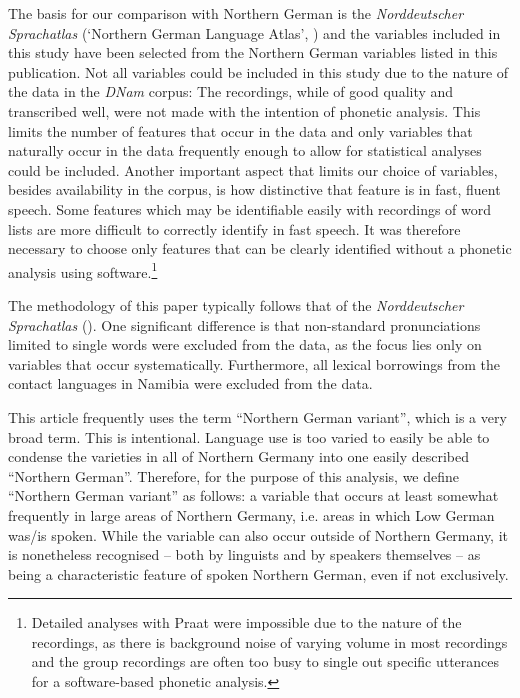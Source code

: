 \documentclass[output=paper]{langsci/langscibook}
\begin{document}
The basis for our comparison with Northern German is the \textit{Norddeutscher Sprachatlas} (‘Northern German Language Atlas’, \citealt{elmentaler_norddeutscher_2015}) and the variables included in this study have been selected from the Northern German variables listed in this publication. Not all variables could be included in this study due to the nature of the data in the \textit{DNam} corpus: The recordings, while of good quality and transcribed well, were not made with the intention of phonetic analysis. This limits the number of features that occur in the data and only variables that naturally occur in the data frequently enough to allow for statistical analyses could be included. Another important aspect that limits our choice of variables, besides availability in the corpus, is how distinctive that feature is in fast, fluent speech. Some features which may be identifiable easily with recordings of word lists are more difficult to correctly identify in fast speech. It was therefore necessary to choose only features that can be clearly identified without a phonetic analysis using software.\footnote{Detailed analyses with Praat were impossible due to the nature of the recordings, as there is background noise of varying volume in most recordings and the group recordings are often too busy to single out specific utterances for a software-based phonetic analysis.}

The methodology of this paper typically follows that of the \textit{Norddeutscher Sprachatlas} (\citealt{elmentaler_norddeutscher_2015}). One significant difference is that non-standard pronunciations limited to single words were excluded from the data, as the focus lies only on variables that occur systematically. Furthermore, all lexical borrowings from the contact languages in Namibia were excluded from the data. 

This article frequently uses the term “Northern German variant”, which is a very broad term. This is intentional. Language use is too varied to easily be able to condense the varieties in all of Northern Germany into one easily described “Northern German”. Therefore, for the purpose of this analysis, we define “Northern German variant” as follows: a variable that occurs at least somewhat frequently in large areas of Northern Germany, i.e. areas in which Low German was/is spoken. While the variable can also occur outside of Northern Germany, it is nonetheless recognised – both by linguists and by speakers themselves – as being a characteristic feature of spoken Northern German, even if not exclusively.
\end{document}
